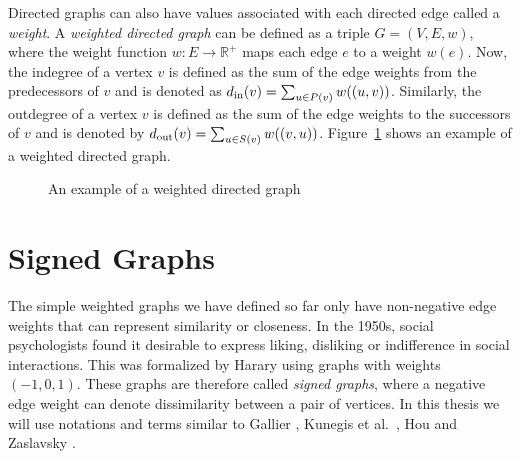 Directed graphs can also have values associated with each directed edge called a \textit{weight}.
A \textit{weighted directed graph} can be defined as a triple $G=(V,E,w)$, where the weight function $w:E \rightarrow \mathbb{R}^{+}$ maps each edge $e$ to a weight $w(e)$.
Now, the indegree of a vertex $v$ is defined as the sum of the edge weights from the predecessors of $v$ and is denoted as $d_{\text{in}}(v) = \sum_{u \in P(v)} w((u,v))$.
Similarly, the outdegree of a vertex $v$ is defined as the sum of the edge weights to the successors of $v$ and is denoted by $d_{\text{out}}(v) = \sum_{u \in S(v)}w((v,u))$.
Figure~\ref{fig:weighted-directed} shows an example of a weighted directed graph.

\begin{figure}[!ht]
    \centering
    
    \caption{An example of a weighted directed graph}
    \label{fig:weighted-directed}
\end{figure}

\section{Signed Graphs}
\label{sec:signed-graphs}
The simple weighted graphs we have defined so far only have non-negative edge weights that can represent similarity or closeness.
In the 1950s, social psychologists found it desirable to express liking, disliking or indifference in social interactions.
This was formalized by Harary \cite{harary1953on} using graphs with weights $(-1,0,1)$.
These graphs are therefore called \textit{signed graphs}, where a negative edge weight can denote dissimilarity between a pair of vertices.
In this thesis we will use notations and terms similar to Gallier \cite{gallier2016spectral}, Kunegis et al.\ \cite{kunegis2010spectral}, Hou \cite{hou2005bounds} and Zaslavsky \cite{zaslavsky1982signed}.

